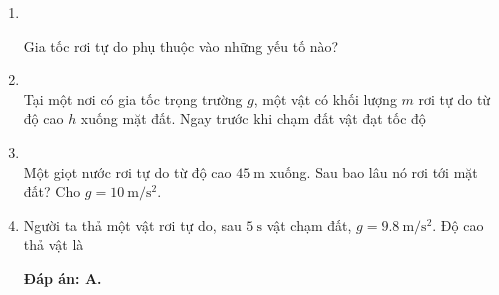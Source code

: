 \begin{enumerate}[label=\bfseries Câu \arabic*:,leftmargin=1.5cm]
{}
	
	\item {}\\
	{Gia tốc rơi tự do phụ thuộc vào những yếu tố nào?
	
}

\item {}\\
Tại một nơi có gia tốc trọng trường $g$, một vật có khối lượng $m$ rơi tự do từ độ cao $h$ xuống mặt đất. Ngay trước khi chạm đất vật đạt tốc độ


\item {}\\
Một giọt nước rơi tự do từ độ cao $\SI{45}{\meter}$ xuống. Sau bao lâu nó rơi tới mặt đất? Cho $g=\SI{10}{\meter/\second^2}$.
	
	\item {}
	
	
	{Người ta thả một vật rơi tự do, sau $\SI{5}{\second}$ vật chạm đất, $g=\SI{9.8}{\meter/\second^2}$. Độ cao thả vật là
	}
	\hideall
	{	\textbf{Đáp án: A.}	
		
}
\end{enumerate}
